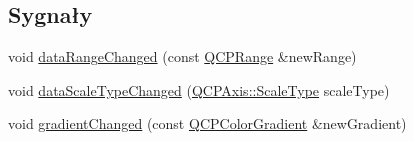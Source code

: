 \subsection*{Sygnały}
\begin{DoxyCompactItemize}
\item 
void \hyperlink{class_q_c_p_color_map_a83ae5be3903da493f732e1a5c14fd807}{data\+Range\+Changed} (const \hyperlink{class_q_c_p_range}{Q\+C\+P\+Range} \&new\+Range)
\item 
void \hyperlink{class_q_c_p_color_map_a978d5d5c9f68cffef8c902b855c04490}{data\+Scale\+Type\+Changed} (\hyperlink{class_q_c_p_axis_a36d8e8658dbaa179bf2aeb973db2d6f0}{Q\+C\+P\+Axis\+::\+Scale\+Type} scale\+Type)
\item 
void \hyperlink{class_q_c_p_color_map_a31a12726736b1ac274e7b1d8dfb67468}{gradient\+Changed} (const \hyperlink{class_q_c_p_color_gradient}{Q\+C\+P\+Color\+Gradient} \&new\+Gradient)
\end{DoxyCompactItemize}
